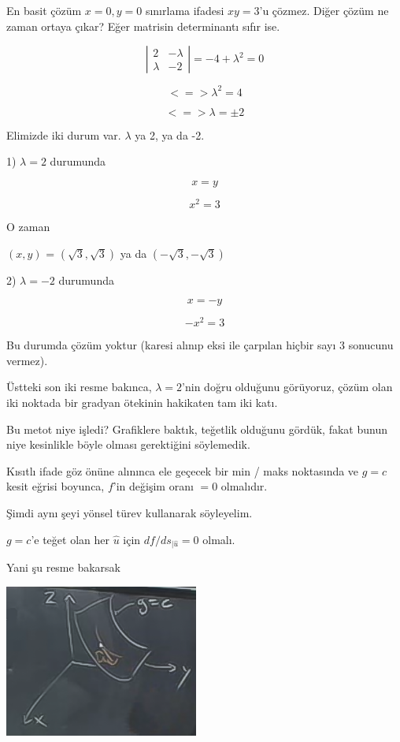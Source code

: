 \documentclass[12pt,fleqn]{article}\usepackage{../../common}
\begin{document}
En basit çözüm $x=0,y=0$ sınırlama ifadesi $xy=3$'u çözmez. Diğer çözüm ne
zaman ortaya çıkar? Eğer matrisin determinantı sıfır ise. 

$$ 
\left|\begin{array}{rr}
2 & -\lambda \\
\lambda & -2
\end{array}\right| = -4 + \lambda^2 = 0
 $$

$$ <=> \lambda^2 = 4 $$

$$ <=> \lambda = \pm 2 $$

Elimizde iki durum var. $\lambda$ ya 2, ya da -2. 

1) $\lambda = 2$ durumunda

$$ x = y $$

$$ x^2 = 3 $$

O zaman

$(x,y)$ = $(\sqrt{3}, \sqrt{3})$ ya da $(-\sqrt{3}, -\sqrt{3})$ 

2) $\lambda = -2$ durumunda

$$ x = -y $$

$$ -x^2 = 3 $$

Bu durumda çözüm yoktur (karesi alınıp eksi ile çarpılan hiçbir sayı 3
sonucunu vermez). 

Üstteki son iki resme bakınca, $\lambda = 2$'nin doğru olduğunu görüyoruz,
çözüm olan iki noktada bir gradyan ötekinin hakikaten tam iki katı. 

Bu metot niye işledi? Grafiklere baktık, teğetlik olduğunu gördük, fakat
bunun niye kesinlikle böyle olması gerektiğini söylemedik. 

Kısıtlı ifade göz önüne alınınca ele geçecek bir min / maks noktasında ve
$g = c$ kesit eğrisi boyunca, $f$'in değişim oranı $=0$ olmalıdır.

Şimdi aynı şeyi yönsel türev kullanarak söyleyelim. 

$g=c$'e teğet olan her $\hat{u}$ için $df / ds_{|\hat{u}} = 0$ olmalı. 

Yani şu resme bakarsak

\begin{center}
\includegraphics[height=5cm]{13_7.png}
\end{center}
\end{document}
